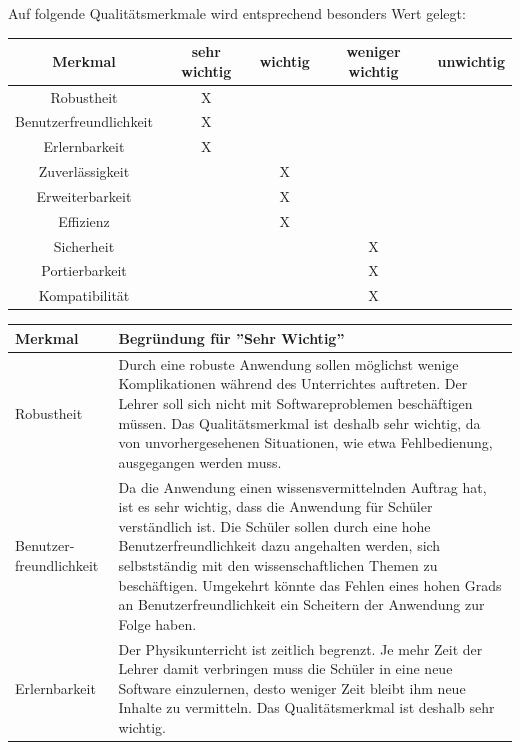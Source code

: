 \documentclass[parskip=full]{scrartcl}
\begin{document}
Auf folgende Qualitätsmerkmale wird entsprechend besonders Wert gelegt:

\begin{tabular}{ | c | c | c | c | c | }
	\hline
	\textbf{Merkmal} & \textbf{sehr wichtig} & \textbf{wichtig} & \textbf{weniger wichtig} & \textbf{unwichtig} \\
	\hline
	Robustheit & X & & & \\
	Benutzerfreundlichkeit & X & & & \\
	Erlernbarkeit & X & & & \\
	Zuverlässigkeit & & X & & \\
	Erweiterbarkeit & & X & & \\
	Effizienz & & X & & \\
	Sicherheit & & & X & \\
	Portierbarkeit & & & X & \\
	Kompatibilität & & & X & \\
	\hline
\end{tabular}

\begin{tabular}{| p{3cm} | p{10cm} |}
	\hline
	\textbf{Merkmal} & \textbf{Begründung für ''Sehr Wichtig''}\\
	\hline
	
	Robustheit & Durch eine robuste Anwendung sollen möglichst wenige Komplikationen während des Unterrichtes auftreten. Der Lehrer soll sich nicht mit Softwareproblemen beschäftigen müssen. Das Qualitätsmerkmal ist deshalb sehr wichtig, da von unvorhergesehenen Situationen, wie etwa Fehlbedienung, ausgegangen werden muss.\\\cline{1-2}
	
	Benutzer-\newline freundlichkeit & Da die Anwendung einen wissensvermittelnden Auftrag hat, ist es sehr wichtig, dass die Anwendung für Schüler verständlich ist. Die Schüler sollen durch eine hohe Benutzerfreundlichkeit dazu angehalten werden, sich selbstständig mit den wissenschaftlichen Themen zu beschäftigen. Umgekehrt könnte das Fehlen eines hohen Grads an Benutzerfreundlichkeit ein Scheitern der Anwendung zur Folge haben.\\\cline{1-2}
	
	Erlernbarkeit & Der Physikunterricht ist zeitlich begrenzt. Je mehr Zeit der Lehrer damit verbringen muss die Schüler in eine neue Software einzulernen, desto weniger Zeit bleibt ihm neue Inhalte zu vermitteln. Das Qualitätsmerkmal ist deshalb sehr wichtig.\\\cline{1-2}
\end{tabular}
\end{document}
